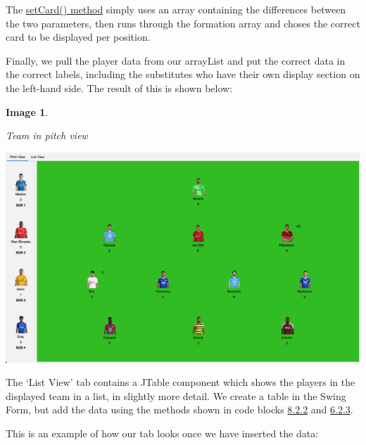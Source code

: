 \documentclass[12pt, a4paper, oneside]{book}
\newtheorem{image}[theorem]{Image}
\numberwithin{equation}{section}
\begin{document}
The \hyperref[setCard method]{setCard() method} simply uses an array containing the differences between the two parameters, then runs through the formation array and choses the correct card to be displayed per position.

Finally, we pull the player data from our arrayList and put the correct data in the correct labels, including the substitutes who have their own display section on the left-hand side. The result of this is shown below:

\begin{image} \label{Team in pitch view}

  Team in pitch view

  \vspace{0.5cm}

  \centerline{\includegraphics[width=1\textwidth]{images/gui/fantasy-tab/team-pitch-view.png}}

\end{image}

The `List View' tab contains a JTable component which shows the players in the displayed team in a list, in slightly more detail. We create a table in the Swing Form, but add the data using the methods shown in code blocks \hyperref[Defining a DefaultTableModel]{8.2.2} and \hyperref[Creating a DataTable object]{6.2.3}.

This is an example of how our tab looks once we have inserted the data:
\end{document}
